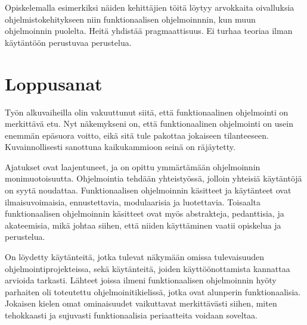 Opiskelemalla esimerkiksi näiden kehittäjien töitä löytyy arvokkaita oivalluksia ohjelmistokehitykseen niin funktionaalisen ohjelmoinnnin, kun muun ohjelmoinnin puolelta. Heitä yhdistää pragmaattisuus. Ei turhaa teoriaa ilman käytäntöön perustuvaa perustelua.

\section{Loppusanat}

Työn alkuvaiheilla olin vakuuttunut siitä, että funktionaalinen ohjelmointi on merkittävä etu. Nyt näkemykseni on, että funktionaalinen ohjelmointi on usein enemmän epäsuora voitto, eikä sitä tule pakottaa jokaiseen tilanteeseen. Kuvainnollisesti sanottuna kaikukammioon seinä on räjäytetty.

Ajatukset ovat laajentuneet, ja on opittu ymmärtämään ohjelmoinnin monimuotoisuutta. Ohjelmointia tehdään yhteistyössä, jolloin yhteisiä käytäntöjä on syytä noudattaa. Funktionaalisen ohjelmoinnin käsitteet ja käytänteet ovat ilmaisuvoimaisia, ennustettavia, modulaarisia ja luotettavia. Toisaalta funktionaalisen ohjelmoinnin käsitteet ovat myös abstrakteja, pedanttisia, ja akateemisia, mikä johtaa siihen, että niiden käyttäminen vaatii opiskelua ja perustelua.

On löydetty käytänteitä, jotka tulevat näkymään omissa tulevaisuuden ohjelmointiprojekteissa, sekä käytänteitä, joiden käyttöönottamista kannattaa arvioida tarkasti. Lähteet joissa ilmeni funktionaalisen ohjelmoinnin hyöty parhaiten oli toteutettu ohjelmoinitikielissä, jotka ovat alunperin funktionaalisia. Jokaisen kielen omat ominaisuudet vaikuttavat merkittävästi siihen, miten tehokkaasti ja sujuvasti funktionaalisia periaatteita voidaan soveltaa.

